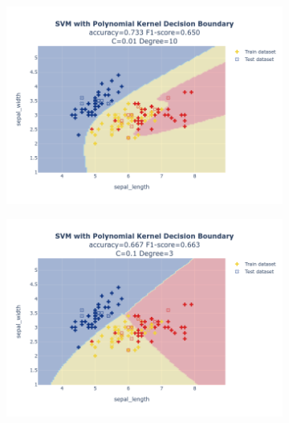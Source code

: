 \documentclass{article}
\begin{document}
\begin{figure}
\begin{subfigure}{0.3\textwidth}
        \includegraphics[scale=.13]{images/implementation/q1/polynomial_kernel/sepal_length_sepal_width_0.01_10.png}
    \end{subfigure}
    \newline
    \begin{subfigure}{0.3\textwidth}
        \centering
        \includegraphics[scale=.13]{images/implementation/q1/polynomial_kernel/sepal_length_sepal_width_0.1_3.png}
    \end{subfigure}
    \hfill
    \begin{subfigure}{0.3\textwidth}
        \centering

\end{subfigure}
\end{figure}
\end{document}
